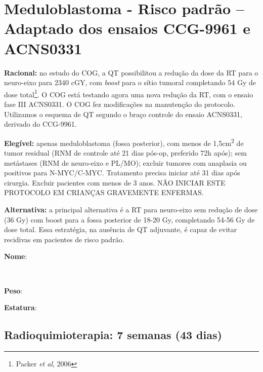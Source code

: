 \documentclass[11pt,a4paper,oldfontcommands]{memoir}
\def\entrywithlabel[#1]#2{\parbox{#1}{{\small #2:} \hrulefill}}
\begin{document}
\section{Meduloblastoma - Risco padrão -- Adaptado dos ensaios CCG-9961 e ACNS0331}
{\let\thefootnote\relax{}}
\textbf{Racional:} no estudo do COG, a QT possibilitou a redução da dose da RT para o neuro-eixo para 2340 cGY, com \textit{boost} para o sítio tumoral completando 54 Gy de dose total\footnote{Packer \textit{et al}, 2006}. O COG está testando agora uma nova redução da RT, com o ensaio fase III ACNS0331. O COG fez modificações na manutenção do protocolo. Utilizamos o esquema de QT segundo o braço controle do ensaio ACNS0331, derivado do CCG-9961.

\textbf{Elegível:} apenas meduloblastoma (fossa posterior), com menos de 1,5cm\textsuperscript{2} de tumor residual (RNM de controle até 21 dias pós-op, preferido 72h após); sem metástases (RNM de neuro-eixo e PL/MO); excluir tumores com anaplasia ou positivos para N-MYC/C-MYC. Tratamento precisa iniciar até 31 dias após cirurgia. Excluir pacientes com menos de 3 anos. NÃO INICIAR ESTE PROTOCOLO EM CRIANÇAS GRAVEMENTE ENFERMAS.

\textbf{Alternativa:} a principal alternativa é a RT para neuro-eixo sem redução de dose (36 Gy) com boost para a fossa posterior de 18-20 Gy, completando 54-56 Gy de dose total. Essa estratégia, na ausência de QT adjuvante, é capaz de evitar recidivas em pacientes de risco padrão.
\\[0.4cm]
\entrywithlabel[1\hsize]{\textbf{Nome}}\hfill
\\[0.3cm]
\entrywithlabel[.45\hsize]{\textbf{Peso}}\hfill  \entrywithlabel[.45\hsize]{\textbf{Estatura}}

\subsection{Radioquimioterapia: 7 semanas (43 dias)}
\end{document}

